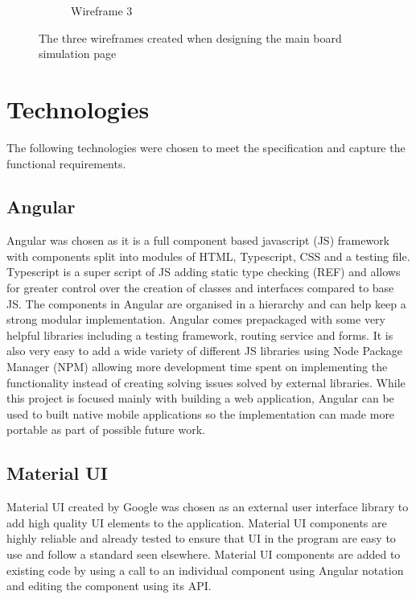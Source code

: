 \documentclass{l4proj}
\begin{document}
\begin{figure}
\begin{subfigure}[b]{0.5\textwidth}
        \caption{Wireframe 3}
        \label{fig:wireframe3}
    \end{subfigure}
    \caption{The three wireframes created when designing the main board simulation page}
    \label{fig:wireframes}
\end{figure}

\section{Technologies}
The following technologies were chosen to meet the specification and capture the functional requirements.

\subsection{Angular}
Angular was chosen as it is a full component based javascript (JS) framework with components split into modules of HTML, Typescript, CSS and a testing file. Typescript is a super script of JS adding static type checking (REF) and allows for greater control over the creation of classes and interfaces compared to base JS. The components in Angular are organised in a hierarchy and can help keep a strong modular implementation. Angular comes prepackaged with some very helpful libraries including a testing framework, routing service and forms. It is also very easy to add a wide variety of different JS libraries using Node Package Manager (NPM) allowing more development time spent on implementing the functionality instead of creating solving issues solved by external libraries. While this project is focused mainly with building a web application, Angular can be used to built native mobile applications so the implementation can made more portable as part of possible future work.

\subsection{Material UI}
Material UI created by Google was chosen as an external user interface library to add high quality UI elements to the application. Material UI components are highly reliable and already tested to ensure that UI in the program are easy to use and follow a standard seen elsewhere. Material UI components are added to existing code by using a call to an individual component using Angular notation and editing the component using its API.
\end{document}
